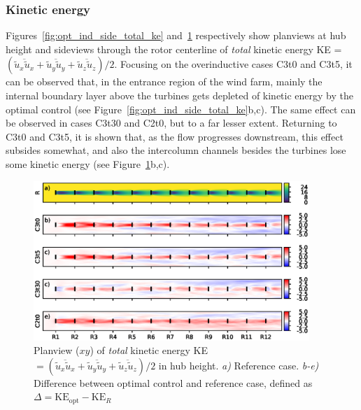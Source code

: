 	\subsubsection{Kinetic energy}

	Figures~\ref{fig:opt_ind_side_total_ke} and~\ref{fig:opt_ind_top_total_ke} respectively show planviews at hub height and sideviews through the rotor
	centerline of \emph{total} kinetic energy KE = $(\overline{\widetilde{u}_x \widetilde{u}_x} + \overline{\widetilde{u}_y \widetilde{u}_y} + \overline{\widetilde{u}_z \widetilde{u}_z})/2$. Focusing on the overinductive cases C3t0 and C3t5, it can be observed that, in the entrance region of the wind farm, mainly the internal boundary layer above the turbines gets depleted of kinetic energy by the optimal control (see Figure~\ref{fig:opt_ind_side_total_ke}b,c). The same effect can be observed in cases C3t30 and C2t0, but to a far lesser extent. Returning to C3t0 and C3t5, it is shown that, as the flow progresses downstream, this effect subsides somewhat, and also the intercolumn channels besides the turbines lose some kinetic energy (see Figure~\ref{fig:opt_ind_top_total_ke}b,c). 

		\begin{figure}[hbt]
			\centering
			\includegraphics[width=0.93\textwidth]{chapters/optimal_induction_control/topview_ke_total.eps}
			\caption[Planview ($xy$) of \emph{total} kinetic energy KE $= (\overline{\widetilde{u}_x \widetilde{u}_x} +
			\overline{\widetilde{u}_y \widetilde{u}_y} + \overline{\widetilde{u}_z \widetilde{u}_z})/2$ in hub height.]{Planview ($xy$) of \emph{total} kinetic energy KE $= (\overline{\widetilde{u}_x \widetilde{u}_x} +
			\overline{\widetilde{u}_y \widetilde{u}_y} + \overline{\widetilde{u}_z \widetilde{u}_z})/2$ in hub height. \emph{a) } Reference case. \emph{b-e)} Difference between optimal control and reference case, defined as $\Delta = \text{KE}_{\text{opt}} - \text{KE}_{R}$  \label{fig:opt_ind_top_total_ke}}
		\end{figure}
	
